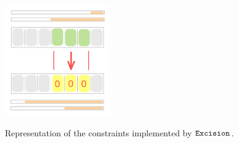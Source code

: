 \begin{figure}[h!]
\centering
\includegraphics[width = 0.4\textwidth]{drawing/excision}
\label{fig: one partial to one padded}
\caption{Representation of the constraints implemented by $\texttt{Excision}$.}
\end{figure}